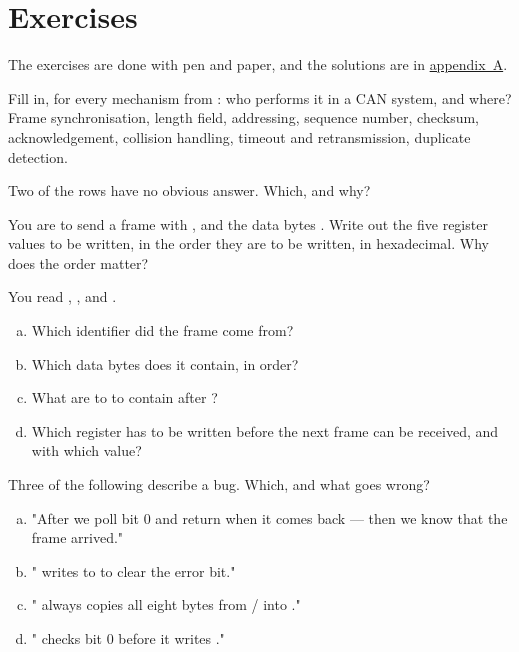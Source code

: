 \section*{Exercises}

The exercises are done with pen and paper, and the solutions are in
\hyperref[ch:losningar]{appendix~A}.

\label{ex:4:1}
Fill in, for every mechanism from : who performs it in a CAN system, and where?
Frame synchronisation, length field, addressing, sequence number, checksum, acknowledgement,
collision handling, timeout and retransmission, duplicate detection.

Two of the rows have no obvious answer. Which, and why?

\label{ex:4:2}
You are to send a frame with ,  and the data bytes
. Write out the five register values to be written, in the order they are to
be written, in hexadecimal. Why does the order matter?

\label{ex:4:3}
You read , ,
 and .
\begin{enumerate}[a)]
  \item Which identifier did the frame come from?
  \item Which data bytes does it contain, in order?
  \item What are  to  to contain after ?
  \item Which register has to be written before the next frame can be received, and with which
    value?
\end{enumerate}

\label{ex:4:4}
Three of the following describe a bug. Which, and what goes wrong?
\begin{enumerate}[a)]
  \item "After  we poll  bit 0 and return  when it comes
    back --- then we know that the frame arrived."
  \item " writes  to  to clear the error bit."
  \item " always copies all eight bytes from / into
    ."
  \item " checks  bit 0 before it writes ."
\end{enumerate}

